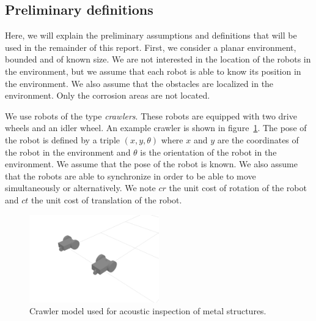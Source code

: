 \documentclass[english,RandD]{rapportPFE}  %
\begin{document}
		\subsection{Preliminary definitions}\label{sec:definitions}
			Here, we will explain the preliminary assumptions and definitions that will be used in the remainder of this report.
			First, we consider a planar environment, bounded and of known size.
			We are not interested in the location of the robots in the environment, but we assume that each robot is able to know its position in the environment.
			We also assume that the obstacles are localized in the environment.
			Only the corrosion areas are not located.

			We use robots of the type \textit{crawlers}. These robots are equipped with two drive wheels and an idler wheel.
			An example crawler is shown in figure~\ref{fig:crawler}.
			The pose of the robot is defined by a triple $(x, y, \theta)$ where $x$ and $y$ are the coordinates of the robot in the environment and $\theta$ is the orientation of the robot in the environment.
			We assume that the pose of the robot is known.
			We also assume that the robots are able to synchronize in order to be able to move simultaneously or alternatively.
			We note $cr$ the unit cost of rotation of the robot and $ct$ the unit cost of translation of the robot.

			\begin{figure}[h!]
				\centering
				\includegraphics[width=0.5\textwidth]{graphics/crawlers.png}
				\caption{Crawler model used for acoustic inspection of metal structures.}
				\label{fig:crawler}
			\end{figure}
\end{document}
